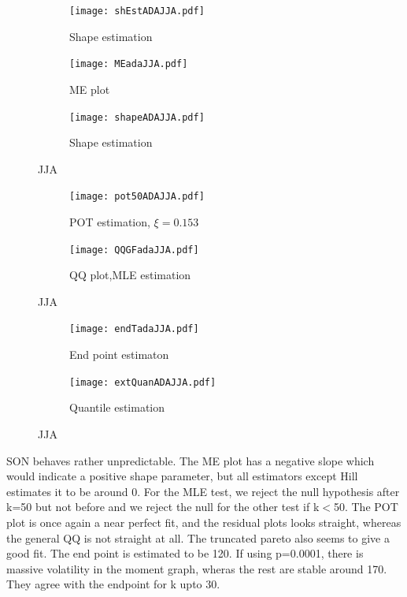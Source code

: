 \documentclass{article}
\begin{document}
	\begin{figure}[H]
		\begin{subfigure}{0.33\textwidth}
			\texttt{[image: shEstADAJJA.pdf]}
			\caption{Shape estimation}
		\end{subfigure}%
		\begin{subfigure}{0.33\textwidth}
			\texttt{[image: MEadaJJA.pdf]}
			\caption{ME plot}
		\end{subfigure}
		\begin{subfigure}{0.33\textwidth}
			\texttt{[image: shapeADAJJA.pdf]}
			\caption{Shape estimation}
		\end{subfigure}
		\caption{JJA}
	\end{figure}

	\begin{figure}[H]
		\centering
		\begin{subfigure}{0.5\textwidth}
			\texttt{[image: pot50ADAJJA.pdf]}
			\caption{POT estimation, $\xi = 0.153$}
		\end{subfigure}%
		\begin{subfigure}{0.5\textwidth}
			\texttt{[image: QQGFadaJJA.pdf]}
			\caption{QQ plot,MLE estimation}
		\end{subfigure}
		\caption{JJA}
	\end{figure}

	\begin{figure}[H]
		\centering
		\begin{subfigure}{0.5\textwidth}
			\texttt{[image: endTadaJJA.pdf]}
			\caption{End point estimaton}
		\end{subfigure}%
		\begin{subfigure}{0.5\textwidth}
			\texttt{[image: extQuanADAJJA.pdf]}
			\caption{Quantile estimation}
		\end{subfigure}
	\caption{JJA}
	\end{figure}
	
	SON behaves rather unpredictable. The ME plot has a negative slope which would indicate a positive shape parameter, but all estimators except Hill estimates it to be around 0. For the MLE test, we reject the null hypothesis after k=50 but not before and we reject the null for the other test if k$<$50. The POT plot is once again a near perfect fit, and the residual plots looks straight, whereas the general QQ is not straight at all. The truncated pareto also seems to give a good fit. The end point is estimated to be 120. If using p=0.0001, there is massive volatility in the moment graph, wheras the rest are stable around 170. They agree with the endpoint for k upto 30. 
	
\end{document}
